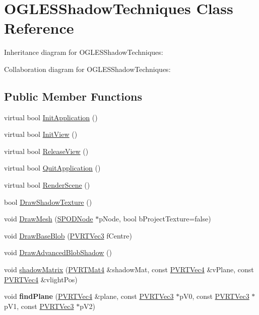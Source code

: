 \hypertarget{class_o_g_l_e_s_shadow_techniques}{\section{O\+G\+L\+E\+S\+Shadow\+Techniques Class Reference}
\label{class_o_g_l_e_s_shadow_techniques}
}


Inheritance diagram for O\+G\+L\+E\+S\+Shadow\+Techniques\+:


Collaboration diagram for O\+G\+L\+E\+S\+Shadow\+Techniques\+:
\subsection*{Public Member Functions}
\begin{DoxyCompactItemize}
\item 
virtual bool \hyperlink{class_o_g_l_e_s_shadow_techniques_a98b340593d9b0c50bbe5ec9d96c92ca6}{Init\+Application} ()
\item 
virtual bool \hyperlink{class_o_g_l_e_s_shadow_techniques_a91c20c54e8dc22e03e229059cafe66f5}{Init\+View} ()
\item 
virtual bool \hyperlink{class_o_g_l_e_s_shadow_techniques_adf2ce807bbd5fb971eff3168a65a5441}{Release\+View} ()
\item 
virtual bool \hyperlink{class_o_g_l_e_s_shadow_techniques_a81f437b464bfdfb6503ce3b7cbf734cb}{Quit\+Application} ()
\item 
virtual bool \hyperlink{class_o_g_l_e_s_shadow_techniques_aec061fb774765373606c7208c0bbaaac}{Render\+Scene} ()
\item 
bool \hyperlink{class_o_g_l_e_s_shadow_techniques_a25ce66195c54223685853929d7b23d82}{Draw\+Shadow\+Texture} ()
\item 
void \hyperlink{class_o_g_l_e_s_shadow_techniques_a267b59ca63c14cf9eb045808a8420b6f}{Draw\+Mesh} (\hyperlink{struct_s_p_o_d_node}{S\+P\+O\+D\+Node} $\ast$p\+Node, bool b\+Project\+Texture=false)
\item 
void \hyperlink{class_o_g_l_e_s_shadow_techniques_a7c7a7e2806bdd68d99d92638758f3831}{Draw\+Base\+Blob} (\hyperlink{struct_p_v_r_t_vec3}{P\+V\+R\+T\+Vec3} f\+Centre)
\item 
void \hyperlink{class_o_g_l_e_s_shadow_techniques_abfdaa3e798a8f3844cf8326941dad8c8}{Draw\+Advanced\+Blob\+Shadow} ()
\item 
void \hyperlink{class_o_g_l_e_s_shadow_techniques_a8da9c85300ba25f59b733451a78827f5}{shadow\+Matrix} (\hyperlink{struct_p_v_r_t_mat4}{P\+V\+R\+T\+Mat4} \&shadow\+Mat, const \hyperlink{struct_p_v_r_t_vec4}{P\+V\+R\+T\+Vec4} \&v\+Plane, const \hyperlink{struct_p_v_r_t_vec4}{P\+V\+R\+T\+Vec4} \&vlight\+Pos)
\item 
\hypertarget{class_o_g_l_e_s_shadow_techniques_a6af8bf25e199b0e8a31befaf41d690ea}{void {\bfseries find\+Plane} (\hyperlink{struct_p_v_r_t_vec4}{P\+V\+R\+T\+Vec4} \&plane, const \hyperlink{struct_p_v_r_t_vec3}{P\+V\+R\+T\+Vec3} $\ast$p\+V0, const \hyperlink{struct_p_v_r_t_vec3}{P\+V\+R\+T\+Vec3} $\ast$p\+V1, const \hyperlink{struct_p_v_r_t_vec3}{P\+V\+R\+T\+Vec3} $\ast$p\+V2)}\label{class_o_g_l_e_s_shadow_techniques_a6af8bf25e199b0e8a31befaf41d690ea}


\end{DoxyCompactItemize}
